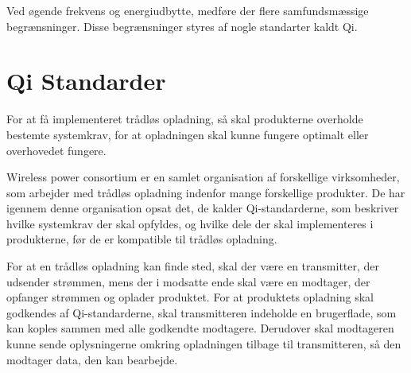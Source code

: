 Ved øgende frekvens og energiudbytte, medføre der flere samfundsmæssige begrænsninger. Disse begrænsninger styres af nogle standarter kaldt Qi. 

\section{Qi Standarder}
For at få implementeret trådløs opladning, så skal produkterne overholde bestemte systemkrav, for at opladningen skal kunne fungere optimalt eller overhovedet fungere.

Wireless power consortium er en samlet organisation af forskellige virksomheder, som arbejder med trådløs opladning indenfor mange forskellige produkter. De har igennem denne organisation opsat det, de kalder Qi-standarderne, som beskriver hvilke systemkrav der skal opfyldes, og hvilke dele der skal implementeres i produkterne, før de er kompatible til trådløs opladning.

For at en trådløs opladning kan finde sted, skal der være en transmitter, der udsender strømmen, mens der i modsatte ende skal være en modtager, der opfanger strømmen og oplader produktet. For at produktets opladning skal godkendes af Qi-standarderne, skal transmitteren indeholde en brugerflade, som kan koples sammen med alle godkendte modtagere. Derudover skal modtageren kunne sende oplysningerne omkring opladningen tilbage til transmitteren, så den modtager data, den kan bearbejde.
\newpage